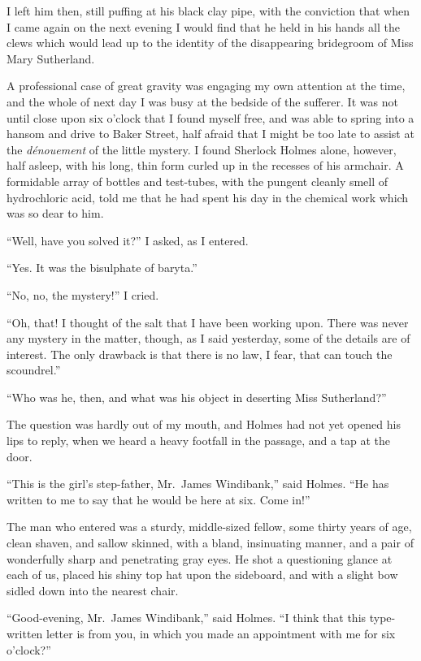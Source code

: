 I left him then, still puffing at his black clay pipe, with the
conviction that when I came again on the next evening I would
find that he held in his hands all the clews which would lead
up to the identity of the disappearing bridegroom of Miss
Mary Sutherland.

A professional case of great gravity was engaging my own
attention at the time, and the whole of next day I was busy
at the bedside of the sufferer. It was not until close upon
six o’clock that I found myself free, and was able to spring
into a hansom and drive to Baker Street, half afraid that I
might be too late to assist at the \textit{dénouement} of the little
mystery. I found Sherlock Holmes alone, however, half asleep,
with his long, thin form curled up in the recesses of his
armchair. A formidable array of bottles and test-tubes, with the
pungent cleanly smell of hydrochloric acid, told me that he
had spent his day in the chemical work which was so dear to
him.

“Well, have you solved it?” I asked, as I entered.

“Yes. It was the bisulphate of baryta.”

“No, no, the mystery!” I cried.

“Oh, that! I thought of the salt that I have been working
upon. There was never any mystery in the matter, though,
as I said yesterday, some of the details are of interest. The
only drawback is that there is no law, I fear, that can touch
the scoundrel.”

“Who was he, then, and what was his object in deserting
Miss Sutherland?”

The question was hardly out of my mouth, and Holmes
had not yet opened his lips to reply, when we heard a heavy
footfall in the passage, and a tap at the door.

“This is the girl’s step-father, Mr.~James Windi\-bank,” said
Holmes. “He has written to me to say that he would be
here at six. Come in!”

The man who entered was a sturdy, middle-sized fellow,
some thirty years of age, clean shaven, and sallow skinned,
with a bland, insinuating manner, and a pair of wonderfully
sharp and penetrating gray eyes. He shot a questioning
glance at each of us, placed his shiny top hat upon the
sideboard, and with a slight bow sidled down into the nearest
chair.

“Good-evening, Mr.~James Windibank,” said Holmes. “I
think that this type-written letter is from you, in which you
made an appointment with me for six o’clock?”

